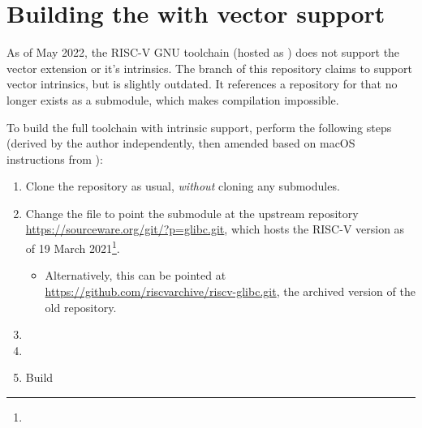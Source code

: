 \chapter{Building the  with vector support}\label{appx:building_rvv_gcc_toolchain}

As of May 2022, the RISC-V GNU toolchain (hosted as ) does not support the vector extension or it's intrinsics.
The  branch of this repository claims to support vector intrinsics, but is slightly outdated.
It references a repository for  that no longer exists as a submodule, which makes compilation impossible.

To build the full toolchain with intrinsic support, perform the following steps (derived by the author independently, then amended based on macOS instructions from ):
\begin{enumerate}
    \item Clone the repository as usual, \emph{without} cloning any submodules.
    \item Change the  file to point the  submodule at the upstream  repository \url{https://sourceware.org/git/?p=glibc.git}, which hosts the RISC-V version as of 19 March 2021\footnote{}.
    
    \begin{itemize}
        \item Alternatively, this can be pointed at \url{https://github.com/riscvarchive/riscv-glibc.git}, the archived version of the old repository.
    \end{itemize}
    
    \item {}
    \item {}
    \item Build
\end{enumerate}

